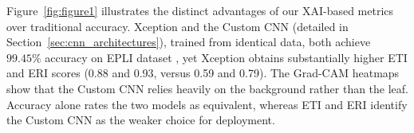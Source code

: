 \documentclass[a4paper,fleqn]{cas-dc}
\begin{document}
    

 
	
	Figure~\ref{fig:figure1} illustrates the distinct advantages of our XAI-based metrics over traditional accuracy. 
	Xception \cite {r25} and the Custom CNN (detailed in Section~\ref{sec:cnn_architectures}), trained from identical data, both achieve $99.45\%$ accuracy on EPLI dataset \cite{r26}, yet Xception obtains substantially higher ETI and ERI scores (0.88 and 0.93, versus 0.59 and 0.79). 
	The Grad-CAM heatmaps show that the Custom CNN relies heavily on the background rather than the leaf. 
	Accuracy alone rates the two models as equivalent, whereas ETI and ERI identify the Custom CNN as the weaker choice for deployment.
	
\end{document}
